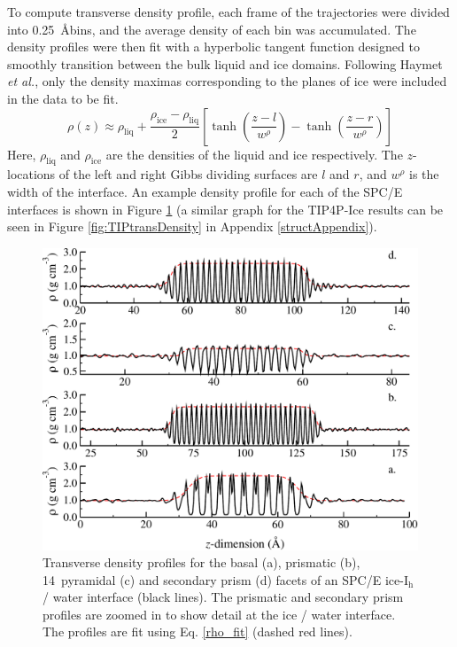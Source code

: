 To compute transverse density profile, each frame of the trajectories
were divided into 0.25~\AA bins, and the average density of each bin
was accumulated. The density profiles were then fit with a hyperbolic
tangent function designed to smoothly transition between the bulk
liquid and ice domains. Following Haymet \textit{et al.}, only the
density maximas corresponding to the planes of ice were included in
the data to be fit.
\begin{equation}\label{rho_fit}
\rho (z) \approx
\rho_\mathrm{liq}+\frac{\rho_\mathrm{ice}-\rho_\mathrm{liq}}{2}\left[\tanh\left(\frac{z-l}{w^\rho}\right)-\tanh\left(\frac{z-r}{w^\rho}\right)\right]
\end{equation}
Here, $\rho_\mathrm{liq}$ and $\rho_\mathrm{ice}$ are the densities of
the liquid and ice respectively. The $z$-locations of the left and
right Gibbs dividing surfaces are $l$ and $r$, and $w^\rho$ is the
width of the interface. An example density profile for each of the
SPC/E interfaces is shown in Figure \ref{fig:transDensity} (a similar
graph for the TIP4P-Ice results can be seen in Figure
\ref{fig:TIPtransDensity} in Appendix \ref{structAppendix}).

\begin{figure}[H]
\includegraphics[width=\linewidth]{Figures/transDensity}
\caption{\label{fig:transDensity}Transverse density profiles for the
  basal (a), prismatic (b), 14\degree~pyramidal (c) and secondary prism (d)
  facets of an SPC/E ice-I$_\mathrm{h}$ / water interface (black
  lines). The prismatic and secondary prism profiles are zoomed in to
  show detail at the ice / water interface. The profiles are fit using
  Eq. \eqref{rho_fit} (dashed red lines).}
\end{figure}

